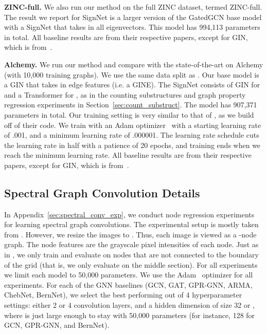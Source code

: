 \documentclass{article} \usepackage{iclr2023_conference,times}
\begin{document}
\textbf{ZINC-full.} We also run our method on the full ZINC dataset, termed ZINC-full. The result we report for SignNet is a larger version of the GatedGCN base model with a SignNet that takes in all eigenvectors. This model has 994,113 parameters in total. All baseline results are from their respective papers, except for GIN, which is from~\citep{bodnar2021weisfeiler}.

\textbf{Alchemy.} We run our method and compare with the state-of-the-art on Alchemy (with 10,000 training graphs). We use the same data split as \citet{morris2020weisfeiler}.  Our base model is a GIN that takes in edge features (i.e. a GINE). The SignNet consists of GIN for  and a Transformer for , as in the counting substructures and graph property regression experiments in Section~\ref{sec:count_substruct}. The model has 907,371 parameters in total. Our training setting is very similar to that of \cite{morris2022speqnets}, as we build off of their code. We train with an Adam optimizer~\citep{kingma2014adam} with a starting learning rate of .001, and a minimum learning rate of .000001. The learning rate schedule cuts the learning rate in half with a patience of 20 epochs, and training ends when we reach the minimum learning rate. All baseline results are from their respective papers, except for GIN, which is from~\citep{morris2022speqnets}.

\subsection{Spectral Graph Convolution Details}

In Appendix~\ref{sec:spectral_conv_exp}, we conduct node regression experiments for learning spectral graph convolutions. The experimental setup is mostly taken from \cite{he2021bernnet}. However, we resize the  images to . Thus, each image is viewed as a -node graph. The node features  are the grayscale pixel intensities of each node. Just as in \cite{he2021bernnet}, we only train and evaluate on nodes that are not connected to the boundary of the grid (that is, we only evaluate on the  middle section). For all experiments we limit each model to 50,000 parameters. We use the Adam~\citep{kingma2014adam} optimizer for all experiments. For each of the GNN baselines (GCN, GAT, GPR-GNN, ARMA, ChebNet, BernNet), we select the best performing out of 4 hyperparameter settings: either 2 or 4 convolution layers, and a hidden dimension of size 32 or , where  is just large enough to stay with 50,000 parameters (for instance,  128 for GCN, GPR-GNN, and BernNet).
\end{document}
